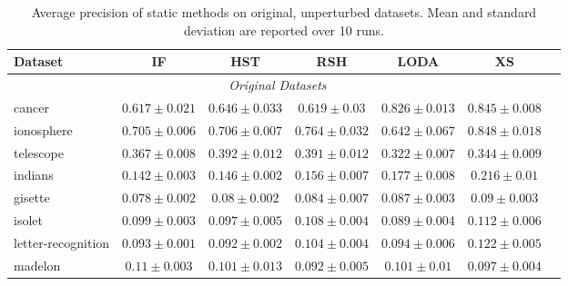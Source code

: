 \documentclass[11pt,onecolumn]{article}
\begin{document}
\begin{footnotesize}
\begin{table}[!hbtp]
		\begin{tabular}{lcccccc}
		\toprule
		\textbf{Dataset} & \textbf{IF} &  \textbf{HST} & \textbf{RSH} &  \textbf{LODA}  & \textbf{XS}\\
		\midrule
				\multicolumn{6}{c}{\textit{Original Datasets}}\\
cancer & $0.617 \pm 0.021$ &  $0.646 \pm 0.033$ &  $0.619 \pm 0.03$ &  $0.826 \pm 0.013$  & $0.845 \pm 0.008$    \\
ionosphere& $0.705 \pm 0.006$ &  $0.706 \pm 0.007$ &  $0.764 \pm 0.032$ &  $0.642 \pm 0.067$ & $0.848 \pm 0.018$    \\
telescope& $0.367 \pm 0.008$ &  $0.392 \pm 0.012$ &  $0.391 \pm 0.012$ &  $0.322 \pm 0.007$ & $0.344 \pm 0.009$    \\
indians& $0.142 \pm 0.003$ &  $0.146 \pm 0.002$ &  $0.156 \pm 0.007$ &  $0.177 \pm 0.008$ & $0.216 \pm 0.01$    \\
gisette& $0.078 \pm 0.002$ &  $0.08 \pm 0.002$ &  $0.084 \pm 0.007$ &  $0.087 \pm 0.003$ & $0.09 \pm 0.003$    \\
isolet& $0.099 \pm 0.003$ &  $0.097 \pm 0.005$ &  $0.108 \pm 0.004$ &  $0.089 \pm 0.004$ & $0.112 \pm 0.006$    \\
letter-recognition& $0.093 \pm 0.001$ &  $0.092 \pm 0.002$ &  $0.104 \pm 0.004$ &  $0.094 \pm 0.006$ & $0.122 \pm 0.005$    \\
madelon& $0.11 \pm 0.003$ &  $0.101 \pm 0.013$ &  $0.092 \pm 0.005$ &  $0.101 \pm 0.01$ & $0.097 \pm 0.004$    \\
		\bottomrule
		\end{tabular}
		\caption{Average precision of static methods on original, unperturbed datasets. Mean and standard deviation are reported over 10 runs.}
\end{table}
\end{footnotesize}
\end{document}
